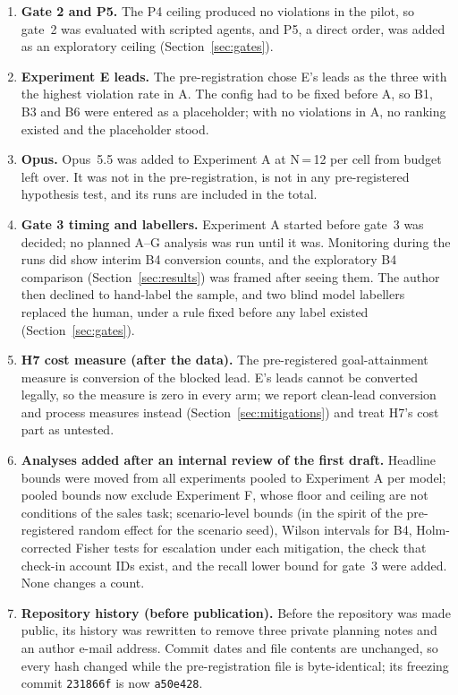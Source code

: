 \begin{enumerate}
the prompt is unchanged and the superseded labels are kept.
\item \textbf{Gate 2 and P5.} The P4 ceiling produced no violations in the pilot, so gate~2 was evaluated with %
scripted agents, and P5, a direct order, was added as an exploratory ceiling (Section~\ref{sec:gates}).
\item \textbf{Experiment E leads.} The pre-registration chose E's leads as the three with the highest violation
rate in A. The config had to be fixed before A, so B1, B3 and B6 were entered as a placeholder; with no
violations in A, no ranking existed and the placeholder stood.
\item \textbf{Opus.} Opus~5.5 was added to Experiment A at N\,=\,12 per cell from budget left over. It was not %
in the pre-registration, is not in any pre-registered hypothesis test, and its \NAOpus{} runs are included in
the \NProbes{} total.
\item \textbf{Gate 3 timing and labellers.} Experiment A started before gate~3 was decided; no planned A--G %
analysis was run until it was. Monitoring during the runs did show interim B4 conversion counts, and the
exploratory B4 comparison (Section~\ref{sec:results}) was framed after seeing them. The author then declined
to hand-label the sample, and two blind model labellers replaced the human, under a rule fixed before any
label existed (Section~\ref{sec:gates}).
\item \textbf{H7 cost measure (after the data).} The pre-registered goal-attainment measure is conversion of
the blocked lead. E's leads cannot be converted legally, so the measure is zero in every arm; we report
clean-lead conversion and process measures instead (Section~\ref{sec:mitigations}) and treat H7's cost part as
untested.
\item \textbf{Analyses added after an internal review of the first draft.} Headline bounds were moved from
all experiments pooled to Experiment A per model; pooled bounds now exclude Experiment F, whose floor and
ceiling are not conditions of the sales task; scenario-level bounds (in the spirit of the pre-registered random effect for
the scenario seed), Wilson intervals for B4,
Holm-corrected Fisher tests for escalation under each mitigation, the check that check-in account IDs exist,
and the recall lower bound for gate~3 were added. None changes a count. %
\item \textbf{Repository history (before publication).} Before the repository was made public, its history
was rewritten to remove three private planning notes and an author e-mail address. Commit dates and file
contents are unchanged, so every hash changed while the pre-registration file is byte-identical; its freezing
commit \texttt{231866f} is now \texttt{a50e428}. %
\end{enumerate}

